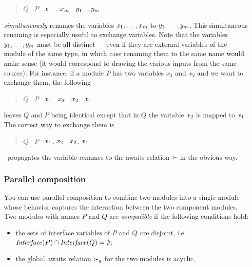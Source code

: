 {\begin{quote}
$Q$ \ASSIGN\ $P$ \LSQBRAC\ $x_1$\COMA\ \ldots \COMA$x_m$ \ASSIGN\ $y_1$\COMA\ \ldots \COMA$y_m$ \RSQBRAC
\end{quote}
%
{\em simultaneously\/} renames the variables $x_1, \ldots, x_m$
to $y_1, \ldots, y_m$.  This simultaneous renaming is
especially useful to exchange variables. Note that the variables $y_1,
\ldots, y_m$ must be all distinct --- even if they are external
variables of the module of the same type, in which case renaming them
to the same name would make sense (it would correspond to drawing the
various inputs from the same source).
For instance, if a module $P$
has two variables $x_1$ and $x_2$ and we want to exchange them, the following 
\begin{quote}
$Q$ \ASSIGN\ $P$ \LSQBRAC\ $x_1$ \ASSIGN\ $x_2$ \RSQBRAC
\LSQBRAC\ $x_2$ \ASSIGN\ $x_1$ \RSQBRAC
\end{quote}
leaves $Q$ and $P$ being identical except that in $Q$ the variable $x_2$ is mapped to $x_1$.
The correct way to exchange them is 
\begin{quote}
$Q$ \ASSIGN\ $P$ \LSQBRAC\ $x_1$, $x_2$ \ASSIGN\ $x_2$, $x_1$ \RSQBRAC
\end{quote}

\mocha\ propagates the variable renames to the awaits
relation $\succ$ in the obvious way.

\subsubsection{Parallel composition}

You can use parallel composition to combine two modules into a single
module whose behavior captures the interaction between the two
component modules.  Two modules with names $P$ and $Q$ are {\em
compatible\/} if the following conditions
hold: 
%
\begin{itemize}
\item the sets of interface variables of $P$ and $Q$ are
disjoint, i.e.\ $\mbox{\it Interface\/}(P) \cap \mbox{\it Interface\/}(Q) = \emptyset$;

\item the global awaits relation $\succ_g$
for the two modules is acyclic. 


\end{itemize}}
